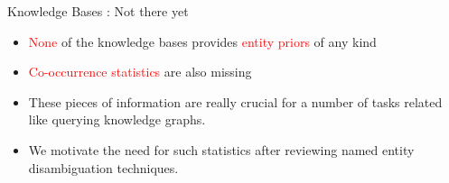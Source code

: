 \begin{frame}{Knowledge Bases : Not there yet}
 \begin{itemize}
  \item \textcolor{red}{None} of the knowledge bases provides \textcolor{red}{entity priors} of any kind \medskip
  \item \textcolor{red}{Co-occurrence statistics} are also missing \medskip
  \item These pieces of information are really crucial for a number of tasks related like querying knowledge
  graphs. \medskip
  \item We motivate the need for such statistics after reviewing named entity disambiguation techniques. 
 \end{itemize}

\end{frame}

